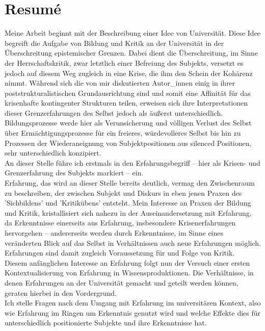\section{Resumé}

Meine Arbeit beginnt mit der Beschreibung einer Idee von Universität. Diese Idee
begreift die Aufgabe von Bildung und Kritik an der Universität in der
Überschreitung epistemischer Grenzen. Dabei dient die Überschreitung, im Sinne
der Herrschaftskritik, zwar letztlich einer Befreiung des Subjekts, versetzt es
jedoch auf diesem Weg zugleich in eine Krise, die ihm den Schein der Kohärenz
nimmt. Während sich die von mir diskutierten Autor\_innen einig in ihrer
poststrukturalistischen Grundausrichtung sind und somit eine Affinität für das
krisenhafte kontingenter Strukturen teilen, erweisen sich ihre Interpretationen
dieser Grenzerfahrungen des Selbst jedoch als äußerst unterschiedlich.\\

Bildungsprozesse werde hier als Verunsicherung und völligen Verlust des Selbst
über Ermächtigungsprozesse für ein freieres, würdevolleres Selbst bis hin zu
Prozessen der Wiederaneignung von Subjektpositionen aus silenced Positionen,
sehr unterschiedlich konzipiert.\\
 An dieser Stelle führe ich erstmals in den
Erfahrungsbegriff – hier als Krisen- und Grenzerfahrung des Subjekts markiert –
ein.\\
 Erfahrung, das wird an dieser Stelle bereits deutlich, vermag den
Zwischenraum zu beschreiben, der zwischen Subjekt und Diskurs in eben jenen
Praxen des 'Sichbildens' und 'Kritikübens' entsteht. Mein Interesse an Praxen
der Bildung und Kritik, kristallisiert sich nahezu in der Auseinandersetzung mit
Erfahrung, da Erkenntnisse einerseits aus Erfahrung, insbesondere
Krisenerfahrungen hervorgehen – andererseits werden durch Erkenntnisse, im Sinne
eines veränderten Blick auf das Selbst in Verhältnissen auch neue Erfahrungen
möglich. Erfahrungen sind damit zugleich Voraussetzung für und Folge von Kritik. 
\\

Diesem anfänglichen Interesse an Erfahrung folgt nun der Versuch einer ersten
Kontextualisierung von Erfahrung in Wissensproduktionen. Die Verhältnisse, in
denen Erfahrungen an der Universität gemacht und geteilt werden können, geraten
hierbei in den Vordergrund. \\
Ich stelle Fragen nach dem Umgang mit Erfahrung im
universitären Kontext, also wie Erfahrung im Ringen um Erkenntnis genutzt wird
und welche Effekte dies für unterschiedlich positionierte Subjekte und ihre
Erkenntnisse hat. 

